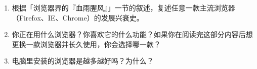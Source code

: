 \practice

\begin{enumerate}
  \item 根据「浏览器界的『血雨腥风』」一节的叙述，复述任意一款主流浏览器（Firefox、IE、Chrome）的发展兴衰史。
  \item 你正在用什么浏览器？你喜欢它的什么功能？如果你在阅读完这部分内容后想更换一款浏览器并长久使用，你会选择哪一款？
  \item 电脑里安装的浏览器是越多越好吗？为什么？
\end{enumerate}